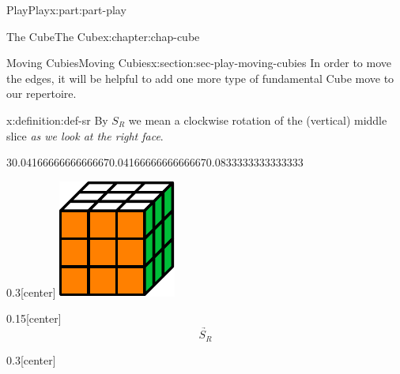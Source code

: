 \documentclass[oneside,10pt,]{book}
\numberwithin{equation}{section}
\begin{document}
\begin{partptx}{Play}{}{Play}{}{}{x:part:part-play}
\begin{chapterptx}{The Cube}{}{The Cube}{}{}{x:chapter:chap-cube}
\begin{sectionptx}{Moving Cubies}{}{Moving Cubies}{}{}{x:section:sec-play-moving-cubies}
In order to move the edges, it will be helpful to add one more type of fundamental Cube move to our repertoire.%
\begin{definition}{}{x:definition:def-sr}%
%
By \(S_R\) we mean a clockwise rotation of the (vertical) middle slice \emph{as we look at the right face}.%
\begin{sidebyside}{3}{0.0416666666666667}{0.0416666666666667}{0.0833333333333333}%
\begin{sbspanel}{0.3}[center]%
\includegraphics[width=\linewidth]{./images/solved_cube.pdf}
\end{sbspanel}%
\begin{sbspanel}{0.15}[center]%
%
\begin{equation*}
\underrightarrow{\quad S_R\quad}
\end{equation*}
%
\end{sbspanel}%
\begin{sbspanel}{0.3}[center]%

\end{sbspanel}
\end{sidebyside}
\end{definition}
\end{sectionptx}
\end{chapterptx}
\end{partptx}
\end{document}
